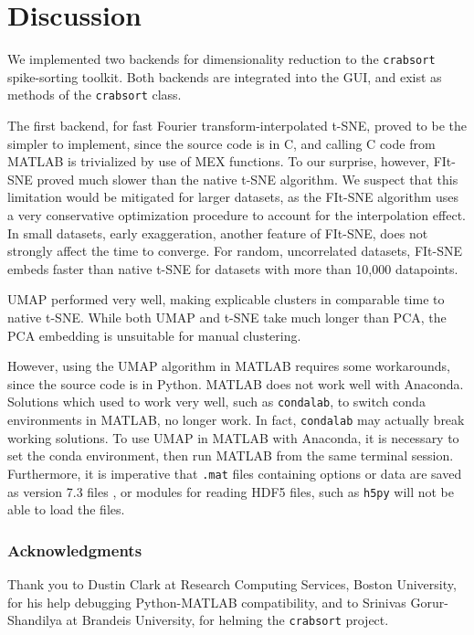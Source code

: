 \documentclass{article}
\begin{document}
\section{Discussion}

We implemented two backends for dimensionality reduction to the \texttt{crabsort}
spike-sorting toolkit.
Both backends are integrated into the GUI,
and exist as methods of the \texttt{crabsort} class.

The first backend, for fast Fourier transform-interpolated t-SNE,
proved to be the simpler to implement, since the source code is in C,
and calling C code from MATLAB is trivialized by use of MEX functions.
To our surprise, however, FIt-SNE proved much slower than the native t-SNE
algorithm.
We suspect that this limitation would be mitigated for larger datasets,
as the FIt-SNE algorithm uses a very conservative optimization procedure
to account for the interpolation effect.
In small datasets, early exaggeration, another feature of FIt-SNE, does not strongly
affect the time to converge.
For random, uncorrelated datasets, FIt-SNE embeds faster than native t-SNE
for datasets with more than 10,000 datapoints.

UMAP performed very well, making explicable clusters in comparable time to native t-SNE.
While both UMAP and t-SNE take much longer than PCA,
the PCA embedding is unsuitable for manual clustering.

However, using the UMAP algorithm in MATLAB requires some workarounds,
since the source code is in Python.
MATLAB does not work well with Anaconda.
Solutions which used to work very well, such as \texttt{condalab},
to switch conda environments in MATLAB, no longer work.
In fact, \texttt{condalab} may actually break working solutions.
To use UMAP in MATLAB with Anaconda, it is necessary to set the conda environment,
then run MATLAB from the same terminal session.
Furthermore, it is imperative that \texttt{.mat} files containing options or data
are saved as version 7.3 files \autocite{MATFileLevelFile2015},
or modules for reading HDF5 files, such as \texttt{h5py} will not be able to load the files.

\subsubsection*{Acknowledgments}

Thank you to Dustin Clark at Research Computing Services, Boston University,
for his help debugging Python-MATLAB compatibility,
and to Srinivas Gorur-Shandilya at Brandeis University,
for helming the \texttt{crabsort} project.

\printbibliography
\end{document}
